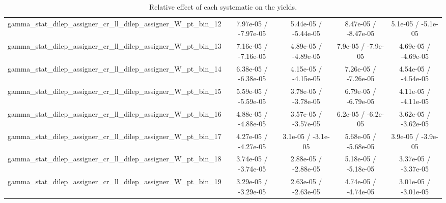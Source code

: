 \documentclass[10pt]{article}
\begin{document}
\begin{table}[htbp]
\begin{center}
\begin{tabular}{|c|c|c|c|c|}
  gamma_stat_dilep_assigner_cr_ll_dilep_assigner_W_pt_bin_12 & 7.97e-05 / -7.97e-05 & 5.44e-05 / -5.44e-05 & 8.47e-05 / -8.47e-05 & 5.1e-05 / -5.1e-05 \\ 
  gamma_stat_dilep_assigner_cr_ll_dilep_assigner_W_pt_bin_13 & 7.16e-05 / -7.16e-05 & 4.89e-05 / -4.89e-05 & 7.9e-05 / -7.9e-05 & 4.69e-05 / -4.69e-05 \\ 
  gamma_stat_dilep_assigner_cr_ll_dilep_assigner_W_pt_bin_14 & 6.38e-05 / -6.38e-05 & 4.15e-05 / -4.15e-05 & 7.26e-05 / -7.26e-05 & 4.54e-05 / -4.54e-05 \\ 
  gamma_stat_dilep_assigner_cr_ll_dilep_assigner_W_pt_bin_15 & 5.59e-05 / -5.59e-05 & 3.78e-05 / -3.78e-05 & 6.79e-05 / -6.79e-05 & 4.11e-05 / -4.11e-05 \\ 
  gamma_stat_dilep_assigner_cr_ll_dilep_assigner_W_pt_bin_16 & 4.88e-05 / -4.88e-05 & 3.57e-05 / -3.57e-05 & 6.2e-05 / -6.2e-05 & 3.62e-05 / -3.62e-05 \\ 
  gamma_stat_dilep_assigner_cr_ll_dilep_assigner_W_pt_bin_17 & 4.27e-05 / -4.27e-05 & 3.1e-05 / -3.1e-05 & 5.68e-05 / -5.68e-05 & 3.9e-05 / -3.9e-05 \\ 
  gamma_stat_dilep_assigner_cr_ll_dilep_assigner_W_pt_bin_18 & 3.74e-05 / -3.74e-05 & 2.88e-05 / -2.88e-05 & 5.18e-05 / -5.18e-05 & 3.37e-05 / -3.37e-05 \\ 
  gamma_stat_dilep_assigner_cr_ll_dilep_assigner_W_pt_bin_19 & 3.29e-05 / -3.29e-05 & 2.63e-05 / -2.63e-05 & 4.74e-05 / -4.74e-05 & 3.01e-05 / -3.01e-05 \\ 
\hline 
\end{tabular} 
\caption{Relative effect of each systematic on the yields.} 
\end{center} 
\end{table} 
\end{document}
